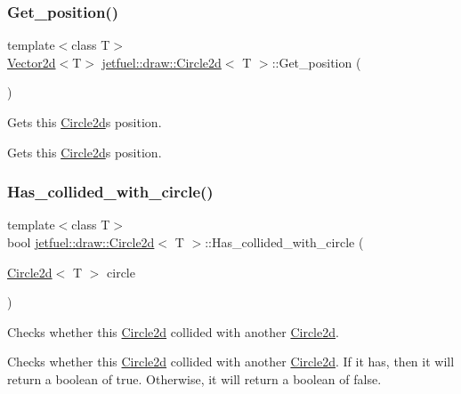 \subsubsection{\texorpdfstring{Get\+\_\+position()}{Get\_position()}}
{\footnotesize\ttfamily template$<$class T$>$ \\
\hyperlink{classjetfuel_1_1draw_1_1Vector2d}{Vector2d}$<$T$>$ \hyperlink{classjetfuel_1_1draw_1_1Circle2d}{jetfuel\+::draw\+::\+Circle2d}$<$ T $>$\+::Get\+\_\+position (\begin{DoxyParamCaption}{ }\end{DoxyParamCaption})\hspace{0.3cm}{\ttfamily [inline]}}



Gets this \hyperlink{classjetfuel_1_1draw_1_1Circle2d}{Circle2d}\textquotesingle{}s position. 

Gets this \hyperlink{classjetfuel_1_1draw_1_1Circle2d}{Circle2d}\textquotesingle{}s position. \mbox{\label{classjetfuel_1_1draw_1_1Circle2d_aa34855d4f859792e7343608571af5501}} 
\subsubsection{\texorpdfstring{Has\+\_\+collided\+\_\+with\+\_\+circle()}{Has\_collided\_with\_circle()}}
{\footnotesize\ttfamily template$<$class T$>$ \\
bool \hyperlink{classjetfuel_1_1draw_1_1Circle2d}{jetfuel\+::draw\+::\+Circle2d}$<$ T $>$\+::Has\+\_\+collided\+\_\+with\+\_\+circle (\begin{DoxyParamCaption}\item[{\hyperlink{classjetfuel_1_1draw_1_1Circle2d}{Circle2d}$<$ T $>$}]{circle }\end{DoxyParamCaption})\hspace{0.3cm}{\ttfamily [inline]}}



Checks whether this \hyperlink{classjetfuel_1_1draw_1_1Circle2d}{Circle2d} collided with another \hyperlink{classjetfuel_1_1draw_1_1Circle2d}{Circle2d}. 

Checks whether this \hyperlink{classjetfuel_1_1draw_1_1Circle2d}{Circle2d} collided with another \hyperlink{classjetfuel_1_1draw_1_1Circle2d}{Circle2d}. If it has, then it will return a boolean of true. Otherwise, it will return a boolean of false.



